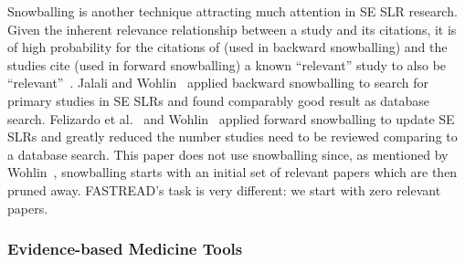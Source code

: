 \documentclass[final,twocolumn,5p]{elsarticle}
\theoremstyle{break}
\begin{document}
Snowballing is another technique attracting much attention in SE SLR research. Given the inherent relevance relationship between a study and its citations, it is of high probability for the citations of (used in backward snowballing) and the studies cite (used in forward snowballing) a known ``relevant'' study to also be ``relevant''~\cite{kitchenham2004evidence}. Jalali and Wohlin~\cite{jalali2012systematic,wohlin2014guidelines} applied backward snowballing to search for primary studies in SE SLRs and found comparably good result as database search. Felizardo et al.~\cite{felizardo2016using} and Wohlin~\cite{wohlin2016second} applied forward snowballing to update SE SLRs and greatly reduced the number studies need to be reviewed comparing to a database search. 
 This paper does not use snowballing since, as mentioned by Wohlin~\cite{wohlin2014guidelines}, snowballing starts with an initial set of relevant papers which are then pruned away.
FASTREAD's task is very different: we start with zero relevant papers.






\subsubsection{Evidence-based Medicine Tools}
\label{sect: Evidence-based Medicine}
\end{document}
